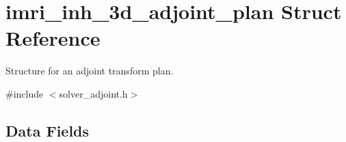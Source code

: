 \hypertarget{structimri__inh__3d__adjoint__plan}{\section{imri\-\_\-inh\-\_\-3d\-\_\-adjoint\-\_\-plan Struct Reference}
\label{structimri__inh__3d__adjoint__plan}
}


Structure for an adjoint transform plan.  




{\ttfamily \#include $<$solver\-\_\-adjoint.\-h$>$}

\subsection*{Data Fields}
